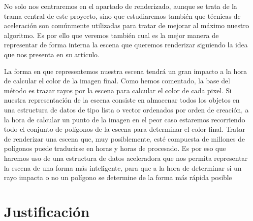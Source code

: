\documentclass[titlepage,12pt]{article}
\begin{document}
No solo nos centraremos en el apartado de renderizado, aunque se trata de la trama central de este proyecto, sino que estudiaremos también que técnicas de aceleración son comúnmente utilizadas para tratar de mejorar al máximo nuestro algoritmo. Es por ello que veremos también cual es la mejor manera de representar de forma interna la escena que queremos renderizar siguiendo la idea que nos presenta \citep{Karras2012} en su artículo.

La forma en que representemos nuestra escena tendrá un gran impacto a la hora de calcular el color de la imagen final. Como hemos comentado, la base del método es trazar rayos por la escena para calcular el color de cada pixel. Si nuestra representación de la escena consiste en almacenar todos los objetos en una estructura de datos de tipo lista o vector ordenados por orden de creación, a la hora de calcular un punto de la imagen en el peor caso estaremos recorriendo todo el conjunto de polígonos de la escena para determinar el color final. Tratar de renderizar una escena que, muy posiblemente, esté compuesta de millones de polígonos puede traducirse en horas y horas de procesado. Es por eso que haremos uso de una estructura de datos aceleradora que nos permita representar la escena de una forma más inteligente, para que a la hora de determinar si un rayo impacta o no un polígono se determine de la forma más rápida posible

\section{Justificación}
\end{document}

